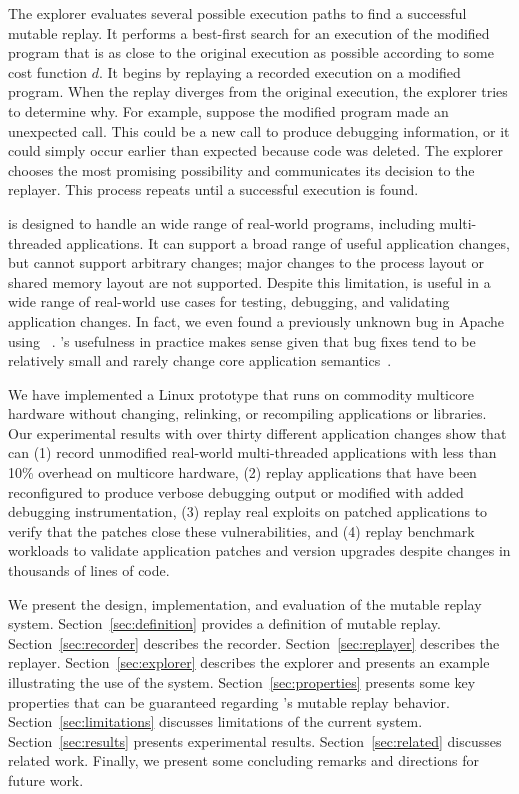 The explorer evaluates several possible execution paths to find a successful
mutable replay.  It performs a best-first search for an execution of
the modified program that is as close to the original execution as
possible according to some cost function $d$. It begins by replaying a
recorded execution on a modified program. When the replay diverges
from the original execution, the explorer tries to determine
why. For example, suppose the modified program made an unexpected
 call. This could be a new call to produce debugging
information, or it could simply occur earlier than expected because
code was deleted. The explorer chooses the most promising possibility
and communicates its decision to the replayer. This process repeats
until a successful execution is found.

{\dora} is designed to handle an wide range of real-world programs,
including multi-threaded applications. It can support a broad range
of useful application changes, but cannot support arbitrary
changes; major changes to the process layout or shared memory
layout are not supported. Despite this limitation,
{\dora} is useful in a wide range of real-world use cases for
testing, debugging, and validating application changes.  In fact, we
even found a previously unknown bug in Apache using {\dora}~\cite{apache-bug-53131}.
{\dora}'s usefulness in practice makes sense given
that bug fixes tend to be relatively small and rarely change core
application semantics~\cite{delta,mreplay-feas}.

We have implemented a {\dora} Linux prototype that runs on
commodity multicore hardware without changing, relinking, or
recompiling applications or libraries.  Our experimental results with
over thirty different application changes show that {\dora} can (1)
record unmodified real-world multi-threaded applications with less
than 10\% overhead on multicore hardware, (2) replay applications that
have been reconfigured to produce verbose debugging output or modified
with added debugging instrumentation, (3) replay real exploits on
patched applications to verify that the patches close these
vulnerabilities, and (4) replay benchmark workloads to validate
application patches and version upgrades despite changes in thousands of lines
of code.

	We present the design, implementation, and evaluation of the
	{\dora} mutable replay system.
	Section~\ref{sec:definition} provides a definition of mutable replay.
	Section~\ref{sec:recorder} describes the {\dora} recorder.
	Section~\ref{sec:replayer} describes the {\dora} replayer.
	Section~\ref{sec:explorer} describes the {\dora} explorer and presents an
	example illustrating the use of the system.
	Section~\ref{sec:properties} presents some key properties that
        can be guaranteed regarding
	{\dora}'s mutable replay behavior.
	Section~\ref{sec:limitations} discusses limitations of the current system.
	Section~\ref{sec:results} presents experimental results.
	Section~\ref{sec:related} discusses related work.
	Finally, we present some concluding remarks and directions for future work.

